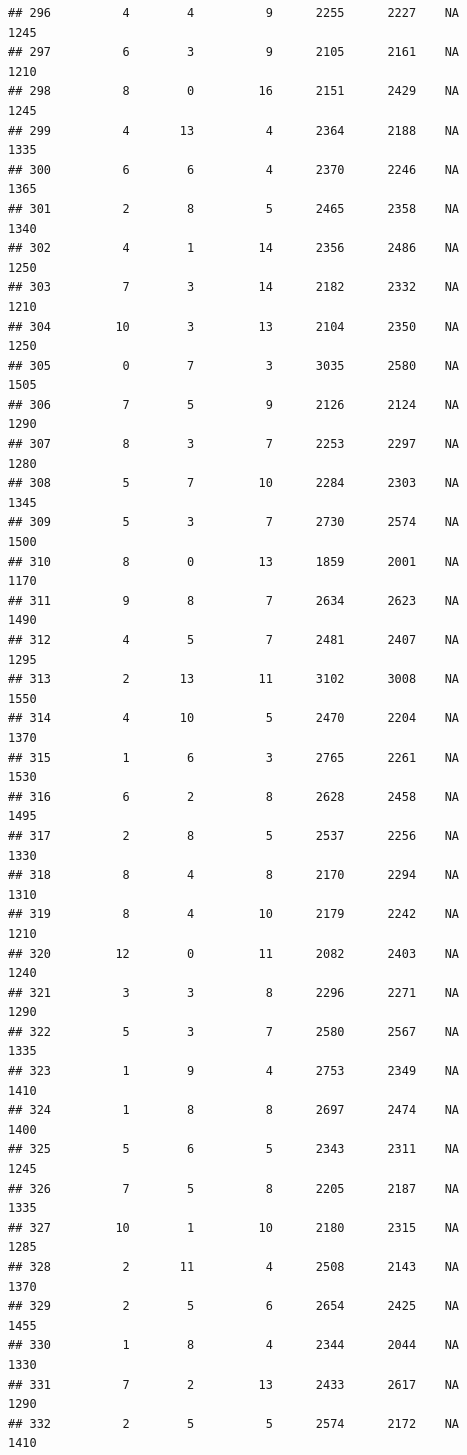 \documentclass[]{book}
\begin{document}
\begin{verbatim}
## 296          4        4          9      2255      2227    NA    1245
## 297          6        3          9      2105      2161    NA    1210
## 298          8        0         16      2151      2429    NA    1245
## 299          4       13          4      2364      2188    NA    1335
## 300          6        6          4      2370      2246    NA    1365
## 301          2        8          5      2465      2358    NA    1340
## 302          4        1         14      2356      2486    NA    1250
## 303          7        3         14      2182      2332    NA    1210
## 304         10        3         13      2104      2350    NA    1250
## 305          0        7          3      3035      2580    NA    1505
## 306          7        5          9      2126      2124    NA    1290
## 307          8        3          7      2253      2297    NA    1280
## 308          5        7         10      2284      2303    NA    1345
## 309          5        3          7      2730      2574    NA    1500
## 310          8        0         13      1859      2001    NA    1170
## 311          9        8          7      2634      2623    NA    1490
## 312          4        5          7      2481      2407    NA    1295
## 313          2       13         11      3102      3008    NA    1550
## 314          4       10          5      2470      2204    NA    1370
## 315          1        6          3      2765      2261    NA    1530
## 316          6        2          8      2628      2458    NA    1495
## 317          2        8          5      2537      2256    NA    1330
## 318          8        4          8      2170      2294    NA    1310
## 319          8        4         10      2179      2242    NA    1210
## 320         12        0         11      2082      2403    NA    1240
## 321          3        3          8      2296      2271    NA    1290
## 322          5        3          7      2580      2567    NA    1335
## 323          1        9          4      2753      2349    NA    1410
## 324          1        8          8      2697      2474    NA    1400
## 325          5        6          5      2343      2311    NA    1245
## 326          7        5          8      2205      2187    NA    1335
## 327         10        1         10      2180      2315    NA    1285
## 328          2       11          4      2508      2143    NA    1370
## 329          2        5          6      2654      2425    NA    1455
## 330          1        8          4      2344      2044    NA    1330
## 331          7        2         13      2433      2617    NA    1290
## 332          2        5          5      2574      2172    NA    1410

\end{verbatim}
\end{document}
